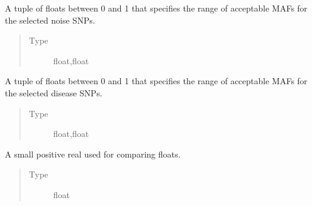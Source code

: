 \documentclass[a4paper,10pt,english]{sphinxhowto}
\begin{document}
\begin{fulllineitems}
\begin{fulllineitems}
\begin{quote}
\begin{description}
\end{description}\end{quote}

\end{fulllineitems}


\begin{fulllineitems}
\label{\detokenize{utils:utils.data_simulator.DataSimulator.noise_maf_range}}
A tuple of floats between 0 and 1 that specifies the range of acceptable MAFs for the selected noise SNPs.
\begin{quote}\begin{description}
\item[{Type}] \leavevmode
float,float

\end{description}\end{quote}

\end{fulllineitems}


\begin{fulllineitems}
\label{\detokenize{utils:utils.data_simulator.DataSimulator.disease_maf_range}}
A tuple of floats between 0 and 1 that specifies the range of acceptable MAFs for the selected disease SNPs.
\begin{quote}\begin{description}
\item[{Type}] \leavevmode
float,float

\end{description}\end{quote}

\end{fulllineitems}


\begin{fulllineitems}
\label{\detokenize{utils:utils.data_simulator.DataSimulator.epsilon}}
A small positive real used for comparing floats.
\begin{quote}\begin{description}
\item[{Type}] \leavevmode
float


\end{description}
\end{quote}
\end{fulllineitems}
\end{fulllineitems}
\end{document}
